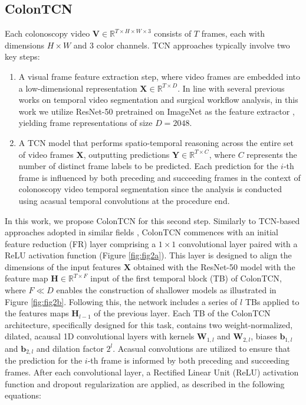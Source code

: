 \subsection{ColonTCN}
\label{subsec:tcn}
Each colonoscopy video \( \mathbf{V} \in \mathbb{R}^{T \times H \times W \times 3} \) consists of \( T \) frames, each with dimensions \( H \times W \) and 3 color channels. TCN approaches typically involve two key steps:

\begin{enumerate}
    \item A visual frame feature extraction step, where video frames are embedded into a low-dimensional representation \( \mathbf{X} \in \mathbb{R}^{T \times D} \). In line with several previous works on temporal video segmentation and surgical workflow analysis, in this work we utilize ResNet-50 pretrained on ImageNet as the feature extractor \cite{he2016deep}, yielding frame representations of size \( D=2048 \).
    \item A TCN model that performs spatio-temporal reasoning across the entire set of video frames \( \mathbf{X} \), outputting predictions \( \mathbf{Y} \in \mathbb{R}^{T \times C} \), where \( C \) represents the number of distinct frame labels to be predicted. Each prediction for the \( i \)-th frame is influenced by both preceding and succeeding frames in the context of  colonoscopy video temporal segmentation since the analysis is conducted using acasual temporal convolutions at the procedure end.
\end{enumerate}

In this work, we propose ColonTCN for this second step. Similarly to TCN-based approaches adopted in similar fields \cite{czempiel2020tecno}, ColonTCN commences with an initial feature reduction (FR) layer comprising a \(1 \times 1\) convolutional layer paired with a ReLU activation function (Figure \ref{fig:fig2a}). This layer is designed to align the dimensions of the input features \( \mathbf{X} \) obtained with the ResNet-50 model with the feature map $\mathbf{H} \in \mathbb{R}^{T \times F}$ input of the first temporal block (TB) of ColonTCN, where $F \ll D$ enables the construction of shallower models as illustrated in Figure \ref{fig:fig2b}. Following this, the network includes a series of \(l\) TBs applied to the features maps \( \mathbf{H}_{l-1} \) of the previous layer. Each TB of the ColonTCN architecture, specifically designed for this task, contains two weight-normalized, dilated, acausal 1D convolutional layers with kernels \(\mathbf{W}_{1,l}\) and \(\mathbf{W}_{2,l}\), biases \(\mathbf{b}_{1,l}\) and \(\mathbf{b}_{2,l}\) and dilation factor \(2^l\). Acasual convolutions are utilized to ensure that the prediction for the \( i \)-th frame is informed by both preceding and succeeding frames. After each convolutional layer, a Rectified Linear Unit (ReLU) activation function and dropout regularization are applied, as described in the following equations:

